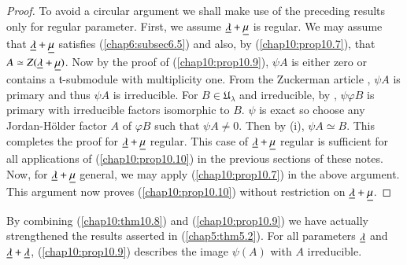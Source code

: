 \begin{proof}
To avoid a circular argument we shall make use of the preceding
results only for regular parameter. First, we assume $\underline{\lambda} +
\underline{\mu}$ is regular. We may assume that $\underline{\lambda} + \underline{\mu}$
satisfies (\ref{chap6:subsec6.5}) and also, by
(\ref{chap10:prop10.7}), that $A \simeq 
Z(\underline{\lambda}+\underline{\mu})$. Now by the proof of (\ref{chap10:prop10.9}), $\psi A$ is
either zero or contains a $\mathfrak{t}$-submodule with multiplicity
one. From the Zuckerman article \cite{key38}, $\psi A$ is primary and
thus $\psi A$ is irreducible. For $B \in \mathfrak{U}_\lambda$ and
irreducible, by  \cite{key38}, $\psi \varphi B$ is primary with
irreducible factors isomorphic to $B$. $\psi$ is exact so choose any
Jordan-H\"older factor $A$ of $\varphi B$ such that $\psi A \neq
0$. Then by (i), $\psi A \simeq B$. This completes the proof for
$\underline{\lambda} + \underline{\mu}$ regular. This case of $\underline{\lambda} + \underline{\mu}$
regular is sufficient for all applications of (\ref{chap10:prop10.10})
in the previous 
sections of these notes. Now, for $\underline{\lambda} + \underline{\mu}$ general, we
may apply (\ref{chap10:prop10.7}) in the above argument. This argument now proves
(\ref{chap10:prop10.10}) without restriction on $\underline{\lambda} + \underline{\mu}$. 
\end{proof}

\begin{remark}\label{chap10:rem10.11}
By combining (\ref{chap10:thm10.8}) and (\ref{chap10:prop10.9}) we
have actually stre\-ngthened the 
results asserted in (\ref{chap5:thm5.2}). For all parameters $\underline{\lambda}$ and
$\underline{\lambda} + \underline{\lambda}$, (\ref{chap10:prop10.9}) describes the image $\psi (A)$
with $A$ irreducible. 
\end{remark}

